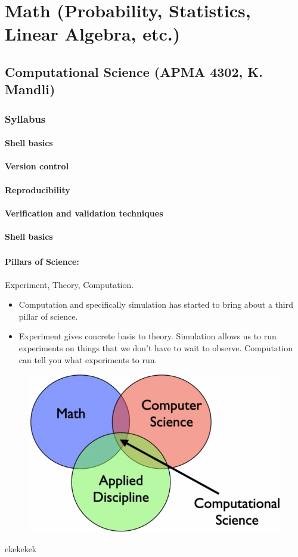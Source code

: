 \chapter{Math (Probability, Statistics, Linear Algebra, etc.)}

\section{Computational Science (APMA 4302, K. Mandli) }
\subsection*{Syllabus}
\subsubsection*{Shell basics}
\subsubsection*{Version control}
\subsubsection*{Reproducibility}
\subsubsection*{Verification and validation techniques}
\subsubsection*{Shell basics}

\subsection*{}

\subsubsection*{Pillars of Science: } Experiment, Theory, Computation.


\begin{itemize}
\item
	Computation and specifically simulation has started to bring about a third pillar of science.

\item
	Experiment gives concrete basis to theory. Simulation allows us to run experiments on things that we don't have to wait to observe. Computation can tell you what experiments to run.
\end{itemize}

\begin{figure}
	\centering
	\includegraphics[width=0.7\linewidth]{images/computational_science_venn_diagram}
	\caption{}
	\label{fig:computationalsciencevenndiagram}
\end{figure}
ekekekek


